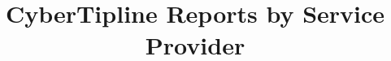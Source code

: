 \documentclass[nonacm,screen,12pt]{acmart}
\theoremstyle{definition}
\begin{document}
\title{CyberTipline Reports by Service Provider}
\author{}
\authorsaddresses{}
\maketitle
\vspace*{-2.5em}


\end{document}
